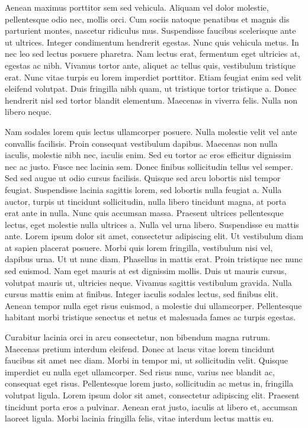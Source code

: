 Aenean maximus porttitor sem sed vehicula. Aliquam vel dolor molestie, pellentesque odio nec, mollis orci. Cum sociis natoque penatibus et magnis dis parturient montes, nascetur ridiculus mus. Suspendisse faucibus scelerisque ante ut ultrices. Integer condimentum hendrerit egestas. Nunc quis vehicula metus. In nec leo sed lectus posuere pharetra. Nam lectus erat, fermentum eget ultricies at, egestas ac nibh. Vivamus tortor ante, aliquet ac tellus quis, vestibulum tristique erat. Nunc vitae turpis eu lorem imperdiet porttitor. Etiam feugiat enim sed velit eleifend volutpat. Duis fringilla nibh quam, ut tristique tortor tristique a. Donec hendrerit nisl sed tortor blandit elementum. Maecenas in viverra felis. Nulla non libero neque.

Nam sodales lorem quis lectus ullamcorper posuere. Nulla molestie velit vel ante convallis facilisis. Proin consequat vestibulum dapibus. Maecenas non nulla iaculis, molestie nibh nec, iaculis enim. Sed eu tortor ac eros efficitur dignissim nec ac justo. Fusce nec lacinia sem. Donec finibus sollicitudin tellus vel semper. Sed sed augue ut odio cursus facilisis. Quisque sed arcu lobortis nisl tempor feugiat. Suspendisse lacinia sagittis lorem, sed lobortis nulla feugiat a. Nulla auctor, turpis ut tincidunt sollicitudin, nulla libero tincidunt magna, at porta erat ante in nulla. Nunc quis accumsan massa. Praesent ultrices pellentesque lectus, eget molestie nulla ultrices a. Nulla vel urna libero. Suspendisse eu mattis ante. 
Lorem ipsum dolor sit amet, consectetur adipiscing elit. Ut vestibulum diam at sapien placerat posuere. Morbi quis lorem fringilla, vestibulum nisi vel, dapibus urna. Ut ut nunc diam. Phasellus in mattis erat. Proin tristique nec nunc sed euismod. Nam eget mauris at est dignissim mollis. Duis ut mauris cursus, volutpat mauris ut, ultricies neque. Vivamus sagittis vestibulum gravida. Nulla cursus mattis enim at finibus. Integer iaculis sodales lectus, sed finibus elit. Aenean tempor nulla eget risus euismod, a molestie dui ullamcorper. Pellentesque habitant morbi tristique senectus et netus et malesuada fames ac turpis egestas.

Curabitur lacinia orci in arcu consectetur, non bibendum magna rutrum. Maecenas pretium interdum eleifend. Donec at lacus vitae lorem tincidunt faucibus sit amet nec diam. Morbi in tempor mi, ut sollicitudin velit. Quisque imperdiet eu nulla eget ullamcorper. Sed risus nunc, varius nec blandit ac, consequat eget risus. Pellentesque lorem justo, sollicitudin ac metus in, fringilla volutpat ligula. Lorem ipsum dolor sit amet, consectetur adipiscing elit. Praesent tincidunt porta eros a pulvinar. Aenean erat justo, iaculis at libero et, accumsan laoreet ligula. Morbi lacinia fringilla felis, vitae interdum lectus mattis eu.

